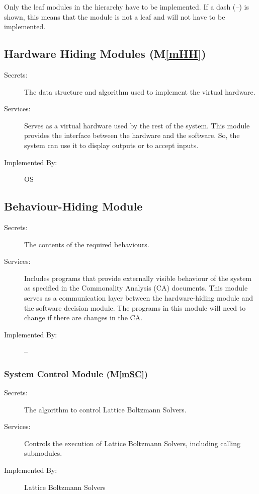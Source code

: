 \documentclass[12pt, titlepage]{article}
\newcommand{\mref}[1]{M\ref{#1}}
\newcommand{\famname}{Lattice Boltzmann Solvers} %
\begin{document}
Only the leaf modules in the hierarchy have to be implemented. If a dash
(\emph{--}) is shown, this means that the module is not a leaf and will not have
to be implemented.

\subsection{Hardware Hiding Modules (\mref{mHH})}

\begin{description}
\item[Secrets:]The data structure and algorithm used to implement the virtual
  hardware.
\item[Services:]Serves as a virtual hardware used by the rest of the
  system. This module provides the interface between the hardware and the
  software. So, the system can use it to display outputs or to accept inputs.
\item[Implemented By:] OS
\end{description}

\subsection{Behaviour-Hiding Module}

\begin{description}
\item[Secrets:]The contents of the required behaviours.
\item[Services:]Includes programs that provide externally visible behaviour of
  the system as specified in the Commonality Analysis (CA)
  documents. This module serves as a communication layer between the
  hardware-hiding module and the software decision module. The programs in this
  module will need to change if there are changes in the CA.
\item[Implemented By:] --
\end{description}

\subsubsection{System Control Module (\mref{mSC})}

\begin{description}
\item[Secrets:]The algorithm to control \famname .
\item[Services:]Controls the execution of \famname , including calling submodules.
\item[Implemented By:] \famname
\end{description}
\end{document}
